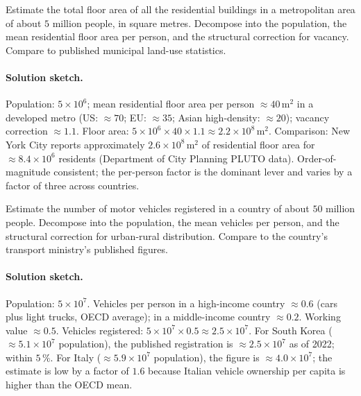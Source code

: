 \begin{exercise}
Estimate the total floor area of all the residential buildings in a
metropolitan area of about $5$ million people, in square metres.
Decompose into the population, the mean residential floor area per
person, and the structural correction for vacancy. Compare to
published municipal land-use statistics.
\end{exercise}

\paragraph{Solution sketch.}
Population: $5 \times 10^{6}$; mean residential floor area per
person $\approx 40 \,\si{\meter\squared}$ in a developed metro (US:
$\approx 70$; EU: $\approx 35$; Asian high-density: $\approx 20$);
vacancy correction $\approx 1.1$. Floor area: $5 \times 10^{6}
\times 40 \times 1.1 \approx 2.2 \times 10^{8} \,\si{\meter\squared}$.
Comparison: New York City reports approximately $2.6 \times 10^{8}
\,\si{\meter\squared}$ of residential floor area for $\approx 8.4
\times 10^{6}$ residents (Department of City Planning PLUTO data).
Order-of-magnitude consistent; the per-person factor is the
dominant lever and varies by a factor of three across countries.

\begin{exercise}
Estimate the number of motor vehicles registered in a country of
about $50$ million people. Decompose into the population, the mean
vehicles per person, and the structural correction for urban-rural
distribution. Compare to the country's transport ministry's
published figures.
\end{exercise}

\paragraph{Solution sketch.}
Population: $5 \times 10^{7}$. Vehicles per person in a
high-income country $\approx 0.6$ (cars plus light trucks, OECD
average); in a middle-income country $\approx 0.2$. Working value
$\approx 0.5$. Vehicles registered: $5 \times 10^{7} \times 0.5
\approx 2.5 \times 10^{7}$. For South Korea ($\approx 5.1 \times
10^{7}$ population), the published registration is $\approx 2.5
\times 10^{7}$ as of 2022; within $5\,\%$. For Italy ($\approx 5.9
\times 10^{7}$ population), the figure is $\approx 4.0 \times
10^{7}$; the estimate is low by a factor of $1.6$ because Italian
vehicle ownership per capita is higher than the OECD mean.

